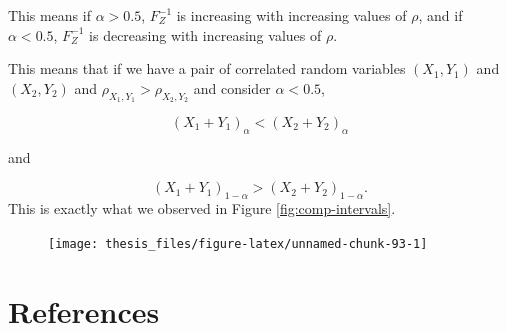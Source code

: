 \documentclass[12pt,twoside]{smiththesis}
\begin{document}
This means if \(\alpha > 0.5\), \(F_Z^{-1}\) is increasing with increasing values of \(\rho\), and if \(\alpha < 0.5\), \(F_Z^{-1}\) is decreasing with increasing values of \(\rho\).

This means that if we have a pair of correlated random variables \((X_1,Y_1)\) and \((X_2,Y_2)\) and \(\rho_{X_1,Y_1} > \rho_{X_2,Y_2}\) and consider \(\alpha < 0.5\),

\[(X_1+Y_1)_\alpha <(X_2+Y_2)_\alpha\]

and

\[(X_1+Y_1)_{1-\alpha} > (X_2+Y_2)_{1-\alpha}.\]
This is exactly what we observed in Figure \ref{fig:comp-intervals}.
\begin{figure}

{\centering \texttt{[image: thesis\_files/figure-latex/unnamed-chunk-93-1]} 

}

\caption{\label{fig:erf}}\label{fig:unnamed-chunk-93}
\end{figure}
\backmatter

\hypertarget{references}{%
\chapter*{References}\label{references}}


\noindent

\setlength{\parindent}{-0.20in}
\setlength{\leftskip}{0.20in}
\setlength{\parskip}{8pt}
\end{document}
